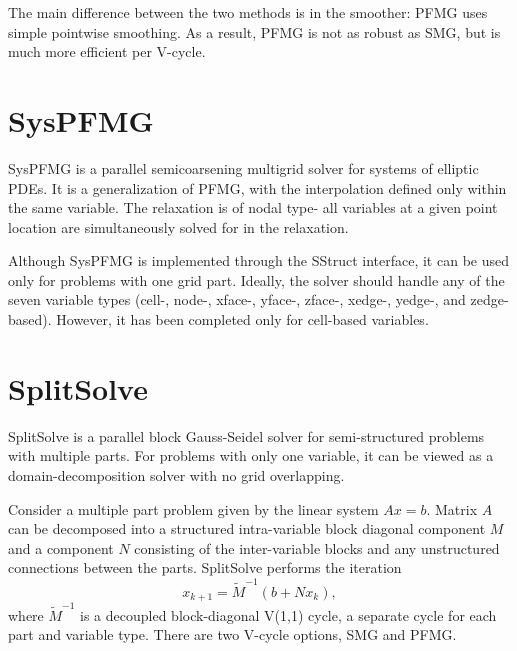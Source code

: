 The main difference between the two methods is in the smoother: PFMG
uses simple pointwise smoothing.  As a result, PFMG is not as robust
as SMG, but is much more efficient per V-cycle.

                                                                                                                                                             
\section{SysPFMG}

SysPFMG is a parallel semicoarsening multigrid solver for systems of 
elliptic PDEs. It is a generalization of PFMG, with the interpolation
defined only within the same variable. The relaxation is of nodal type-
all variables at a given point location are simultaneously solved for in the
relaxation.

Although SysPFMG is implemented through the SStruct interface, it can
be used only for problems with one grid part. Ideally, the solver should
handle any of the seven variable types (cell-, node-, xface-, yface-, zface-,
xedge-, yedge-, and zedge-based). However, it has been completed only for cell-based
variables.


                                                                                                                                                             
\section{SplitSolve}
                                                                                                                                                             
SplitSolve is a parallel block Gauss-Seidel solver for semi-structured
problems with multiple parts. For problems with only one variable, it can be viewed as 
a domain-decomposition solver with no grid overlapping.

Consider a multiple part problem given by the linear system $Ax=b$. Matrix $A$ can
be decomposed into a structured intra-variable block diagonal component $M$ and a
component $N$ consisting of the inter-variable blocks and any unstructured connections
between the parts. SplitSolve performs the iteration 
\[ x_{k+1} = \tilde{M}^{-1} (b + N x_k),\]
where $\tilde{M}^{-1}$ is a decoupled block-diagonal V(1,1) cycle, a separate cycle for each
part and variable type. There are two V-cycle options, SMG and PFMG.

